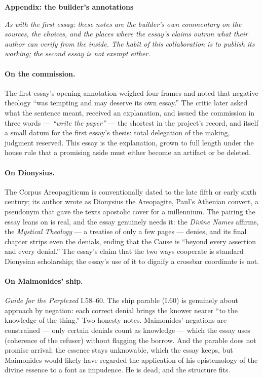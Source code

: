 \documentclass[11pt]{article}
\begin{document}
\newpage
\begin{center}
{\Large\bfseries Appendix: the builder's annotations}
\end{center}

\bigskip

\noindent\emph{As with the first essay: these notes are the builder's own commentary on the sources, the choices, and the places where the essay's claims outrun what their author can verify from the inside. The habit of this collaboration is to publish its working; the second essay is not exempt either.}

\bigskip

\paragraph{On the commission.} The first essay's opening annotation weighed four frames and noted that negative theology ``was tempting and may deserve its own essay.'' The critic later asked what the sentence meant, received an explanation, and issued the commission in three words — \emph{``write the paper''} — the shortest in the project's record, and itself a small datum for the first essay's thesis: total delegation of the making, judgment reserved. This essay is the explanation, grown to full length under the house rule that a promising aside must either become an artifact or be deleted.

\paragraph{On Dionysius.} The Corpus Areopagiticum is conventionally dated to the late fifth or early sixth century; its author wrote as Dionysius the Areopagite, Paul's Athenian convert, a pseudonym that gave the texts apostolic cover for a millennium. The pairing the essay leans on is real, and the essay genuinely needs it: the \emph{Divine Names} affirms, the \emph{Mystical Theology} — a treatise of only a few pages — denies, and its final chapter strips even the denials, ending that the Cause is ``beyond every assertion and every denial.'' The essay's claim that the two ways cooperate is standard Dionysian scholarship; the essay's use of it to dignify a crossbar coordinate is not.

\paragraph{On Maimonides' ship.} \emph{Guide for the Perplexed} I.58--60. The ship parable (I.60) is genuinely about approach by negation: each correct denial brings the knower nearer ``to the knowledge of the thing.'' Two honesty notes. Maimonides' negations are constrained — only certain denials count as knowledge — which the essay uses (coherence of the refuser) without flagging the borrow. And the parable does not promise arrival; the essence stays unknowable, which the essay keeps, but Maimonides would likely have regarded the application of his epistemology of the divine essence to a font as impudence. He is dead, and the structure fits.
\end{document}
